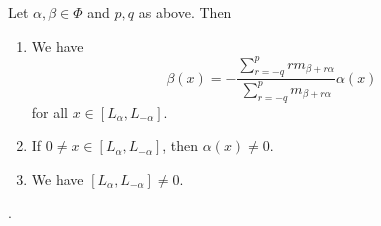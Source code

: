 Let $\alpha, \beta \in \Phi$ and $p, q$ as above. Then
\begin{enumerate}[label=(\alph*)]
	\item We have
		\[ \beta(x) = -\frac{\sum_{r = -q}^prm_{\beta + r\alpha}}{\sum_{r=-q}^pm_{\beta+r\alpha}}\alpha(x) \]
		for all $x \in [L_\alpha, L_{-\alpha}]$.
	\item If $0\neq x \in [L_\alpha, L_{-\alpha}]$, then $\alpha(x)\neq 0$.
	\item We have $[L_\alpha, L_{-\alpha}] \neq 0$.
\end{enumerate}.
